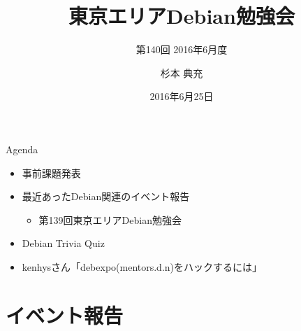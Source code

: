 \title{東京エリアDebian勉強会}
\subtitle{第140回 2016年6月度}
\author{杉本 典充}
\date{2016年6月25日}



\begin{frame}
\titlepage{}
\end{frame}

\begin{frame}{Agenda}
 \begin{minipage}[t]{0.45\hsize}
  \begin{itemize}
   \item 事前課題発表
   \item 最近あったDebian関連のイベント報告
	 \begin{itemize}
	 \item 第139回東京エリアDebian勉強会
	 \end{itemize}
  \end{itemize}
 \end{minipage} 
 \begin{minipage}[t]{0.45\hsize}
  \begin{itemize}
   \item Debian Trivia Quiz
   \item kenhysさん「debexpo(mentors.d.n)をハックするには」
  \end{itemize}
 \end{minipage}
\end{frame}

\section{イベント報告}


